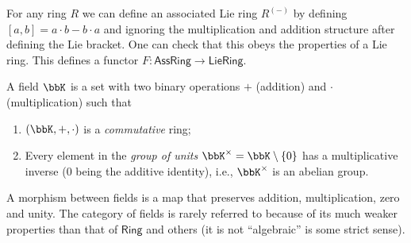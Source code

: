 \begin{example}
For any ring $R$ we can define an associated Lie ring $R^{(-)}$
by defining $[a,b]=a\cdot b-b\cdot a$ and ignoring the multiplication
and addition structure after defining the Lie bracket. One can check
that this obeys the properties of a Lie ring. This defines a functor
$F:\mathsf{AssRing}\rightarrow\mathsf{LieRing}$.
\end{example}
\begin{defn}[Field]
    A field $\bbK$ is a set with two binary operations $+$ (addition)
    and $\cdot$ (multiplication) such that
    \begin{enumerate}
    \item $(\bbK,+,\cdot)$ is a \emph{commutative} ring;
    \item Every element in the \emph{group of units} $\bbK^{\times}=\bbK\setminus\{0\}$ has a multiplicative
    inverse ($0$ being the additive identity), i.e., $\bbK^{\times}$ is an abelian group.
    \end{enumerate}
    A morphism between fields is a map that preserves addition, multiplication,
    zero and unity. The category of fields is rarely referred to because
    of its much weaker properties than that of $\mathsf{Ring}$ and others
    (it is not ``algebraic'' is some strict sense).
\end{defn}
%
